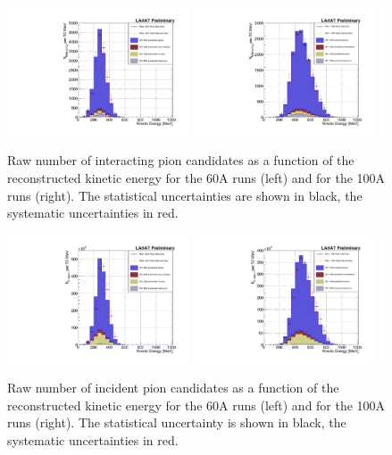 \begin{figure}[p]
\centering  
\includegraphics[width=0.48\textwidth]{Chapter-6/Images/Plots60A_MCData_Int_StatSyst.pdf}
\includegraphics[width=0.48\textwidth]{Chapter-6/Images/Plots100A_MCData_Int_StatSyst.pdf}
\caption{Raw number of interacting pion candidates as a function of the reconstructed kinetic energy for the 60A runs (left) and for the 100A runs (right). The statistical uncertainties are shown in black, the systematic uncertainties in red.}
\label{fig:InteractingRaw}
\end{figure}


\begin{figure}
\centering  
\includegraphics[width=0.48\textwidth]{Chapter-6/Images/Plots60A_MCData_Inc_StatSyst.pdf}
\includegraphics[width=0.48\textwidth]{Chapter-6/Images/Plots100A_MCData_Inc_StatSyst.pdf}
\caption{Raw number of incident pion candidates as a function of the reconstructed kinetic energy for the 60A runs (left) and for the 100A runs (right). The statistical uncertainty is shown in black, the systematic uncertainties in red.}
\label{fig:IncidentRaw}
\end{figure}


